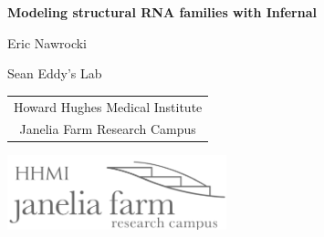 \documentclass[landscape]{slides}
\begin{document}
\begin{slide}
\begin{center}
\large{\textbf{Modeling structural RNA families with Infernal}}

\normalsize

Eric Nawrocki

Sean Eddy's Lab

\medskip

\medskip

\small

\begin{tabular}{c}
Howard Hughes Medical Institute \\ 
Janelia Farm Research Campus \\
\end{tabular}

\vspace{0.1in}

\includegraphics[width=2.5in]{figs/janelia-logo}
\end{center}
\end{slide}
\end{document}
